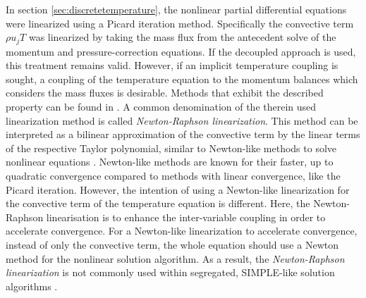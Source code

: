 In section \ref{sec:discretetemperature}, the nonlinear partial differential equations were linearized using a Picard iteration method. Specifically the convective term \(\rho u_j T\) was linearized by taking the mass flux from the antecedent solve of the momentum and pressure-correction equations. If the decoupled approach is used, this treatment remains valid. However, if an implicit temperature coupling is sought, a coupling of the temperature equation to the momentum balances which considers the mass fluxes is desirable. Methods that exhibit the described property can be found in \cite{galpin86,oliveira01,sheu04,vakilipour12}. A common denomination of the therein used linearization method is called \emph{Newton-Raphson linearization}. This method can be interpreted as a bilinear approximation of the convective term by the linear terms of the respective Taylor polynomial, similar to Newton-like methods to solve nonlinear equations \cite{ferziger02}. Newton-like methods are known for their faster, up to quadratic convergence compared to methods with linear convergence, like the Picard iteration. However, the intention of using a Newton-like linearization for the convective term of the temperature equation is different. Here, the Newton-Raphson linearisation is to enhance the inter-variable coupling in order to accelerate convergence. For a Newton-like linearization to accelerate convergence, instead of only the convective term, the whole equation should use a Newton method for the nonlinear solution algorithm. As a result, the \emph{Newton-Raphson linearization} is not commonly used within segregated, SIMPLE-like solution algorithms \cite{ferziger02}.

